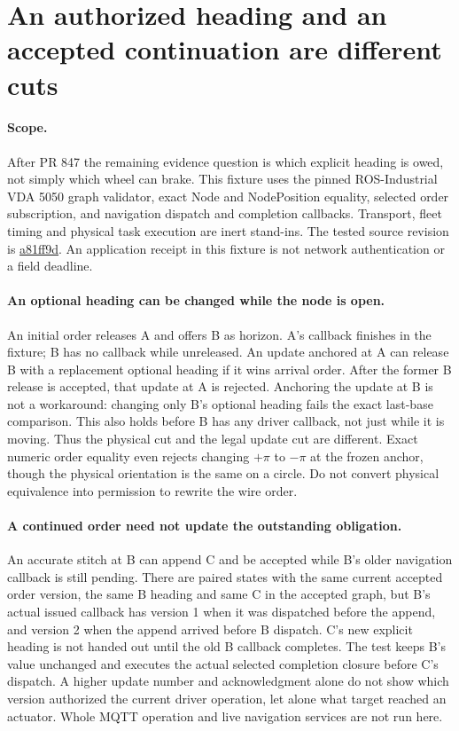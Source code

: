 \documentclass{article}
\begin{document}
\section*{An authorized heading and an accepted continuation are different cuts}
\paragraph{Scope.}
After PR 847 the remaining evidence question is which explicit
heading is owed, not simply which wheel can brake. This fixture
uses the pinned ROS-Industrial VDA 5050 graph validator, exact
Node and NodePosition equality, selected order subscription,
and navigation dispatch and completion callbacks. Transport,
fleet timing and physical task execution are inert stand-ins.
The tested source revision is
\href{https://github.com/ros-industrial/vda5050_core/tree/a81ff9d600e8e30a35af25c152a3445c29c12f5f}{a81ff9d}.
An application receipt in this fixture is not network
authentication or a field deadline.

\paragraph{An optional heading can be changed while the node is open.}
An initial order releases A and offers B as horizon. A's callback
finishes in the fixture; B has no callback while unreleased.
An update anchored at A can release B with a replacement optional
heading if it wins arrival order. After the former B release is
accepted, that update at A is rejected. Anchoring the update at
B is not a workaround: changing only B's optional heading fails
the exact last-base comparison. This also holds before B has any
driver callback, not just while it is moving. Thus the physical
cut and the legal update cut are different. Exact numeric order
equality even rejects changing \(+\pi\) to \(-\pi\) at the frozen
anchor, though the physical orientation is the same on a circle.
Do not convert physical equivalence into permission to rewrite
the wire order.

\paragraph{A continued order need not update the outstanding obligation.}
An accurate stitch at B can append C and be accepted while B's
older navigation callback is still pending. There are paired states
with the same current accepted order version, the same B heading
and same C in the accepted graph, but B's actual issued callback
has version 1 when it was dispatched before the append, and
version 2 when the append arrived before B dispatch.
C's new explicit heading is not handed out until the old B
callback completes. The test keeps B's value unchanged and
executes the actual selected completion closure before C's
dispatch. A higher update number and acknowledgment alone do
not show which version authorized the current driver operation,
let alone what target reached an actuator.
Whole MQTT operation and live navigation services are not
run here.
\end{document}
